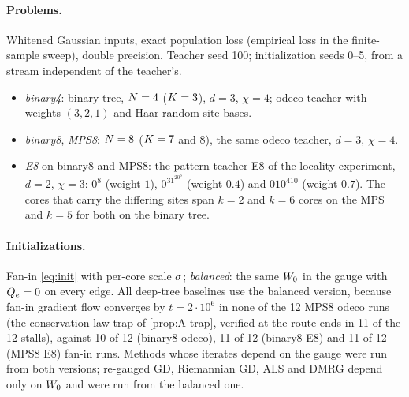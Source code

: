 \paragraph{Problems.}
Whitened Gaussian inputs, exact population loss (empirical loss in the finite-sample sweep), double
precision. Teacher seed 100; initialization seeds 0--5, from a stream independent of the teacher's.
\begin{itemize}
  \item \emph{binary4}: binary tree, $N=4$ ($K=3$), $d=3$, $\chi=4$; odeco teacher with weights
    $(3,2,1)$ and Haar-random site bases.
  \item \emph{binary8}, \emph{MPS8}: $N=8$ ($K=7$ and $8$), the same odeco teacher, $d=3$, $\chi=4$.
  \item \emph{E8} on binary8 and MPS8: the pattern teacher E8 of the locality experiment, $d=2$, $\chi=3$:
    $0^8$ (weight $1$), $0^31^20^3$ (weight $0.4$) and $010^410$ (weight $0.7$). The cores that carry the
    differing sites span $k=2$ and $k=6$ cores on the MPS and $k=5$ for both on the binary tree.
\end{itemize}

\paragraph{Initializations.}
Fan-in \eqref{eq:init} with per-core scale $\sigma$; \emph{balanced}: the same $W_{0}$ in the gauge with
$Q_{e}=0$ on every edge. All deep-tree baselines use the balanced version, because fan-in gradient flow
converges by $t=2\cdot10^6$ in none of the 12 MPS8 odeco runs (the conservation-law trap of
\cref{prop:A-trap}, verified at the route ends in 11 of the 12 stalls), against 10 of 12 (binary8
odeco), 11 of 12 (binary8 E8) and 11 of 12 (MPS8 E8) fan-in runs. Methods whose iterates depend on the
gauge were run from both versions; re-gauged GD, Riemannian GD, ALS and DMRG depend only on $W_{0}$
and were run from the balanced one.

